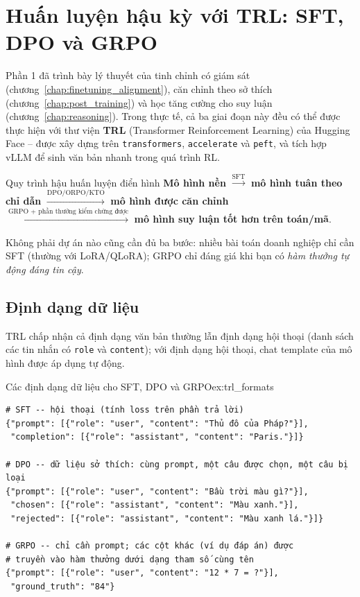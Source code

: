 
\section{Huấn luyện hậu kỳ với TRL: SFT, DPO và GRPO}
\label{sec:posttraining_trl}

Phần 1 đã trình bày lý thuyết của tinh chỉnh có giám sát (chương~\ref{chap:finetuning_alignment}), căn chỉnh theo sở thích (chương~\ref{chap:post_training}) và học tăng cường cho suy luận (chương~\ref{chap:reasoning}). Trong thực tế, cả ba giai đoạn này đều có thể được thực hiện với thư viện \textbf{TRL} (Transformer Reinforcement Learning) của Hugging Face -- được xây dựng trên \texttt{transformers}, \texttt{accelerate} và \texttt{peft}, và tích hợp vLLM để sinh văn bản nhanh trong quá trình RL.

\begin{checklist}{Quy trình hậu huấn luyện điển hình}
\textbf{Mô hình nền} $\xrightarrow{\text{SFT}}$ \textbf{mô hình tuân theo chỉ dẫn} $\xrightarrow{\text{DPO/ORPO/KTO}}$ \textbf{mô hình được căn chỉnh} $\xrightarrow{\text{GRPO + phần thưởng kiểm chứng được}}$ \textbf{mô hình suy luận tốt hơn trên toán/mã}.

Không phải dự án nào cũng cần đủ ba bước: nhiều bài toán doanh nghiệp chỉ cần SFT (thường với LoRA/QLoRA); GRPO chỉ đáng giá khi bạn có \emph{hàm thưởng tự động đáng tin cậy}.
\end{checklist}

\subsection{Định dạng dữ liệu}
\label{ssec:trl_data_formats}
TRL chấp nhận cả định dạng văn bản thường lẫn định dạng hội thoại (danh sách các tin nhắn có \texttt{role} và \texttt{content}); với định dạng hội thoại, chat template của mô hình được áp dụng tự động.

\begin{example}{Các định dạng dữ liệu cho SFT, DPO và GRPO}{ex:trl_formats}
\begin{verbatim}
# SFT -- hội thoại (tính loss trên phần trả lời)
{"prompt": [{"role": "user", "content": "Thủ đô của Pháp?"}],
 "completion": [{"role": "assistant", "content": "Paris."}]}

# DPO -- dữ liệu sở thích: cùng prompt, một câu được chọn, một câu bị loại
{"prompt": [{"role": "user", "content": "Bầu trời màu gì?"}],
 "chosen": [{"role": "assistant", "content": "Màu xanh."}],
 "rejected": [{"role": "assistant", "content": "Màu xanh lá."}]}

# GRPO -- chỉ cần prompt; các cột khác (ví dụ đáp án) được
# truyền vào hàm thưởng dưới dạng tham số cùng tên
{"prompt": [{"role": "user", "content": "12 * 7 = ?"}],
 "ground_truth": "84"}
\end{verbatim}
\end{example}

